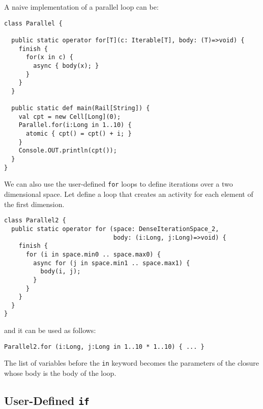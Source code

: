 \begin{example}
  A naive implementation of a parallel loop can be:
\begin{verbatim}
class Parallel {

  public static operator for[T](c: Iterable[T], body: (T)=>void) {
    finish {
      for(x in c) {
        async { body(x); }
      }
    }
  }

  public static def main(Rail[String]) {
    val cpt = new Cell[Long](0);
    Parallel.for(i:Long in 1..10) {
      atomic { cpt() = cpt() + i; }
    }
    Console.OUT.println(cpt());
  }
}
\end{verbatim}
\end{example}

\begin{example}
  We can also use the user-defined \verb+for+ loops to define
  iterations over a two dimensional space. Let define a loop that
  creates an activity for each element of the first dimension.
\begin{verbatim}
class Parallel2 {
  public static operator for (space: DenseIterationSpace_2,
                              body: (i:Long, j:Long)=>void) {
    finish {
      for (i in space.min0 .. space.max0) {
        async for (j in space.min1 .. space.max1) {
          body(i, j);
        }
      }
    }
  }
}
\end{verbatim}
and it can be used as follows:
\begin{verbatim}
Parallel2.for (i:Long, j:Long in 1..10 * 1..10) { ... }
\end{verbatim}
The list of variables before the \verb+in+ keyword becomes the
parameters of the closure whose body is the body of the loop.
\end{example}

\subsection{User-Defined \texttt{if}}

